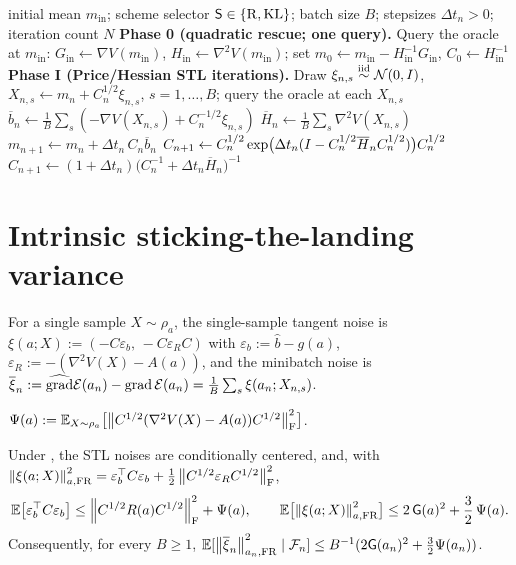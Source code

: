 \begin{algorithm}[t]
\caption{Quadratic-rescued minibatch Price/Hessian STL Fisher--Rao scheme}
\label{alg:unified}
\begin{algorithmic}[1]
\Require initial mean $m_{\mathrm{in}}$; scheme selector $\mathsf S\in\{\mathrm{R},\mathrm{KL}\}$; batch size $B$;
stepsizes $\Delta t_n>0$; iteration count $N$
\State \textbf{Phase 0 (quadratic rescue; one query).} Query the oracle at $m_{\mathrm{in}}$:
$G_{\mathrm{in}}\gets\nabla V(m_{\mathrm{in}})$, $H_{\mathrm{in}}\gets\nabla^2V(m_{\mathrm{in}})$;
set $m_0\gets m_{\mathrm{in}}-H_{\mathrm{in}}^{-1}G_{\mathrm{in}}$, $C_0\gets H_{\mathrm{in}}^{-1}$
\State \textbf{Phase I (Price/Hessian STL iterations).}
    \State Draw $\xi_{n,s}\overset{\text{iid}}{\sim}\mathcal{N}(0,I)$, $X_{n,s}\gets m_n+C_n^{1/2}\xi_{n,s}$, $s=1,\dots,B$; query the oracle at each $X_{n,s}$
    \State $\overline b_n\gets\frac1B\sum_s(-\nabla V(X_{n,s})+C_n^{-1/2}\xi_{n,s})$ 
    \State $\overline H_n\gets\frac1B\sum_s\nabla^2V(X_{n,s})$ 
    \State $m_{n+1}\gets m_n+\Delta t_n\,C_n\overline b_n$
        \State $C_{n+1}\gets C_n^{1/2}\exp\bigl(\Delta t_n(I-C_n^{1/2}\overline H_nC_n^{1/2})\bigr)C_n^{1/2}$
    \Else
        \State $C_{n+1}\gets(1+\Delta t_n)\bigl(C_n^{-1}+\Delta t_n\overline H_n\bigr)^{-1}$
    \EndIf
\EndFor
\end{algorithmic}
\end{algorithm}

\section{Intrinsic sticking-the-landing variance}
\label{sec:intrinsic-STL}

For a single sample $X\sim\rho_a$, the single-sample tangent noise is
$\xi(a;X):=(-C\varepsilon_b,\,-C\varepsilon_RC)$ with $\varepsilon_b:=\widehat b-g(a)$,
$\varepsilon_R:=-(\nabla^2V(X)-A(a))$, and the minibatch noise is
$\overline\xi_n:=\widehat{\operatorname{grad}}\mathcal{E}(a_n)-\operatorname{grad}\mathcal{E}(a_n)=\tfrac1B\sum_s\xi(a_n;X_{n,s})$.

\begin{definition}
\label{def:Psi}
$\Psi(a):=\mathbb{E}_{X\sim\rho_a}\bigl[\left\lVert C^{1/2}(\nabla^2V(X)-A(a))C^{1/2}\right\rVert_{\mathrm{F}}^2\bigr]$.
\end{definition}

\begin{lemma}
\label{lem:intrinsic-STL}
Under , the STL noises are conditionally centered, and, with
$\left\lVert \xi(a;X)\right\rVert_{a,\mathrm{FR}}^2=\varepsilon_b^\top C\varepsilon_b+\tfrac12\left\lVert C^{1/2}\varepsilon_RC^{1/2}\right\rVert_{\mathrm{F}}^2$,
\begin{equation}
\label{eq:intrinsic-mean}
    \mathbb{E}\bigl[\varepsilon_b^\top C\varepsilon_b\bigr]\leq\left\lVert C^{1/2}R(a)C^{1/2}\right\rVert_{\mathrm{F}}^2+\Psi(a),
    \qquad
    \mathbb{E}\bigl[\left\lVert \xi(a;X)\right\rVert_{a,\mathrm{FR}}^2\bigr]\leq2\,\mathsf{G}(a)^2+\frac32\,\Psi(a).
\end{equation}
Consequently, for every $B\geq1$,
$\mathbb{E}[\left\lVert \overline\xi_n\right\rVert_{a_n,\mathrm{FR}}^2\mid\mathcal{F}_n]\leq B^{-1}(2\mathsf{G}(a_n)^2+\tfrac32\Psi(a_n))$.
\end{lemma}

